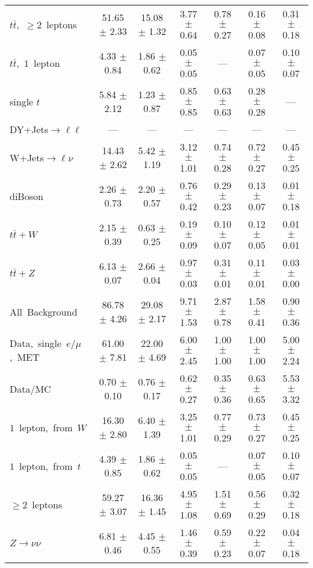 \documentclass{article}
\begin{document}
\begin{longtable}{|l|c|c|c|c|c|c|}
$t\bar{t}$,~$\ge2$~leptons & 51.65 $\pm$ 2.33  & 15.08 $\pm$ 1.32  & 3.77 $\pm$ 0.64  & 0.78 $\pm$ 0.27  & 0.16 $\pm$ 0.08  & 0.31 $\pm$ 0.18 \\* 
$t\bar{t}$,~$1$~lepton & 4.33 $\pm$ 0.84  & 1.86 $\pm$ 0.62  & 0.05 $\pm$ 0.05  & ---  & 0.07 $\pm$ 0.05  & 0.10 $\pm$ 0.07 \\* 
single $t$  & 5.84 $\pm$ 2.12  & 1.23 $\pm$ 0.87  & 0.85 $\pm$ 0.85  & 0.63 $\pm$ 0.63  & 0.28 $\pm$ 0.28  & --- \\* 
DY+Jets$\rightarrow\ell\ell$  & ---  & ---  & ---  & ---  & ---  & --- \\* 
W+Jets$\rightarrow\ell\nu$  & 14.43 $\pm$ 2.62  & 5.42 $\pm$ 1.19  & 3.12 $\pm$ 1.01  & 0.74 $\pm$ 0.28  & 0.72 $\pm$ 0.27  & 0.45 $\pm$ 0.25 \\* 
diBoson  & 2.26 $\pm$ 0.73  & 2.20 $\pm$ 0.57  & 0.76 $\pm$ 0.42  & 0.29 $\pm$ 0.23  & 0.13 $\pm$ 0.07  & 0.01 $\pm$ 0.18 \\* 
$t\bar{t}+W$  & 2.15 $\pm$ 0.39  & 0.63 $\pm$ 0.25  & 0.19 $\pm$ 0.09  & 0.10 $\pm$ 0.07  & 0.12 $\pm$ 0.05  & 0.01 $\pm$ 0.01 \\* 
$t\bar{t}+Z$  & 6.13 $\pm$ 0.07  & 2.66 $\pm$ 0.04  & 0.97 $\pm$ 0.03  & 0.31 $\pm$ 0.01  & 0.11 $\pm$ 0.01  & 0.03 $\pm$ 0.00 \\* 
\hline \hline 
All~Background  & 86.78 $\pm$ 4.26  & 29.08 $\pm$ 2.17  & 9.71 $\pm$ 1.53  & 2.87 $\pm$ 0.78  & 1.58 $\pm$ 0.41  & 0.90 $\pm$ 0.36 \\* 
Data,~single~$e/\mu$,~MET  & 61.00 $\pm$ 7.81  & 22.00 $\pm$ 4.69  & 6.00 $\pm$ 2.45  & 1.00 $\pm$ 1.00  & 1.00 $\pm$ 1.00  & 5.00 $\pm$ 2.24 \\* 
Data/MC  & 0.70 $\pm$ 0.10  & 0.76 $\pm$ 0.17  & 0.62 $\pm$ 0.27  & 0.35 $\pm$ 0.36  & 0.63 $\pm$ 0.65  & 5.53 $\pm$ 3.32 \\* 
\hline \hline 
$1$~lepton,~from~$W$  & 16.30 $\pm$ 2.80  & 6.40 $\pm$ 1.39  & 3.25 $\pm$ 1.01  & 0.77 $\pm$ 0.29  & 0.73 $\pm$ 0.27  & 0.45 $\pm$ 0.25 \\* 
$1$~lepton,~from~$t$  & 4.39 $\pm$ 0.85  & 1.86 $\pm$ 0.62  & 0.05 $\pm$ 0.05  & ---  & 0.07 $\pm$ 0.05  & 0.10 $\pm$ 0.07 \\* 
$\ge2$~leptons  & 59.27 $\pm$ 3.07  & 16.36 $\pm$ 1.45  & 4.95 $\pm$ 1.08  & 1.51 $\pm$ 0.69  & 0.56 $\pm$ 0.29  & 0.32 $\pm$ 0.18 \\* 
$Z\rightarrow\nu\nu$  & 6.81 $\pm$ 0.46  & 4.45 $\pm$ 0.55  & 1.46 $\pm$ 0.39  & 0.59 $\pm$ 0.23  & 0.22 $\pm$ 0.07  & 0.04 $\pm$ 0.18 \\* 
\hline 
\end{longtable} 
\end{document}
